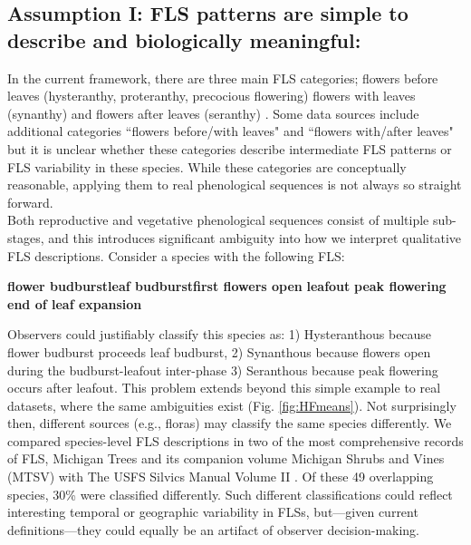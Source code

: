 \documentclass{article}
\begin{document}
{\subsection*{Assumption I: FLS patterns are simple to describe and biologically meaningful:}
In the current framework, there are three main FLS categories; flowers before leaves (hysteranthy, proteranthy, precocious flowering) flowers with leaves (synanthy) and flowers after leaves (seranthy) \citep{Lamont2011, Heinig1899}. Some data sources \citep[e.g.][]{Burns1990,Barnes2004} include additional categories ``flowers before/with leaves" and ``flowers with/after leaves" but it is unclear whether these categories describe intermediate FLS patterns or FLS variability in these species. While these categories are conceptually reasonable, applying them to real phenological sequences is not always so straight forward.\\

Both reproductive and vegetative phenological sequences consist of multiple sub-stages, and this introduces significant ambiguity into how we interpret qualitative FLS descriptions. Consider a species with the following FLS:\\

\begin{center}
\textbf{flower budburst}\rightarrow \textbf{leaf budburst}\rightarrow \textbf{first flowers open} \rightarrow \textbf{leafout} \rightarrow \textbf{peak flowering} \rightarrow \textbf{end of leaf expansion}\\
\end{center}

\noindent Observers could justifiably classify this species as: 1) Hysteranthous because flower budburst proceeds leaf budburst, 2) Synanthous because flowers open during the budburst-leafout inter-phase 3) Seranthous because peak flowering occurs after leafout. This problem extends beyond this simple example to real datasets, \citep[e.g.][]{OKeefe2015} where the same ambiguities exist (Fig. \ref{fig:HFmeans}). Not surprisingly then, different sources (e.g., floras) may classify the same species differently. We compared species-level FLS descriptions in two of the most comprehensive records of FLS, Michigan Trees and its companion volume Michigan Shrubs and Vines (MTSV) \citep{Barnes2004,Barnes2016} with The USFS Silvics Manual Volume II \citep{Burns1990}. Of these 49 overlapping species, 30\% were classified differently. Such different classifications could reflect interesting temporal or geographic variability in FLSs, but---given current definitions---they could equally be an artifact of observer decision-making.\\

}
\end{document}
